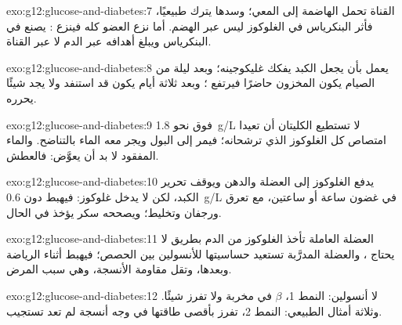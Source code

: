 \begin{solution}{exo:g12:glucose-and-diabetes:7}
القناة تحمل  الهاضمة إلى المعي؛ وسدها يترك  طبيعيًا،
فأثر البنكرياس في الغلوكوز ليس عبر الهضم. أما نزع العضو كله فينزع
:  يصنع في البنكرياس ويبلغ أهدافه عبر الدم لا عبر
القناة.
\end{solution}

\begin{solution}{exo:g12:glucose-and-diabetes:8}
 يعمل بأن يجعل الكبد يفكك غليكوجينه؛ وبعد ليلة من الصيام
يكون المخزون حاضرًا فيرتفع ؛ وبعد ثلاثة أيام يكون 
قد استنفد ولا يجد  شيئًا يحرره.
\end{solution}

\begin{solution}{exo:g12:glucose-and-diabetes:9}
فوق نحو \qty{1.8}{g/L} لا تستطيع الكليتان أن تعيدا امتصاص كل الغلوكوز
الذي ترشحانه؛ فيمر إلى البول ويجر معه الماء بالتناضح. والماء المفقود
لا بد أن يعوَّض: فالعطش.
\end{solution}

\begin{solution}{exo:g12:glucose-and-diabetes:10}
 يدفع الغلوكوز إلى  العضلة والدهن ويوقف تحرير الكبد،
لكن لا يدخل غلوكوز: فيهبط  دون \qty{0.6}{g/L} في غضون ساعة أو
ساعتين، مع تعرق ورجفان وتخليط؛ ويصححه سكر يؤخذ في الحال.
\end{solution}

\begin{solution}{exo:g12:glucose-and-diabetes:11}
العضلة العاملة تأخذ الغلوكوز من الدم بطريق لا يحتاج ،
والعضلة المدرَّبة تستعيد حساسيتها للأنسولين بين الحصص؛ فيهبط 
أثناء الرياضة وبعدها، وتقل مقاومة الأنسجة، وهي سبب المرض.
\end{solution}

\begin{solution}{exo:g12:glucose-and-diabetes:12}
لا أنسولين: النمط 1،  $\beta$ في  مخربة ولا تفرز شيئًا.
وثلاثة أمثال  الطبيعي: النمط 2،  تفرز بأقصى طاقتها في
وجه أنسجة لم تعد تستجيب.
\end{solution}

